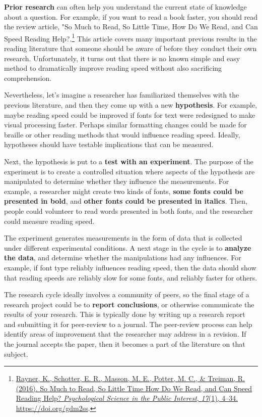 \documentclass[
  oneside,
  12pt]{crumpbook}
\begin{document}
\textbf{Prior research} can often help you understand the current state of knowledge about a question. For example, if you want to read a book faster, you should read the review article, "So Much to Read, So Little Time, How Do We Read, and Can Speed Reading Help?.\footnote{\protect\hyperlink{ref-raynerMuchReadLittle2016}{Rayner, K., Schotter, E. R., Masson, M. E., Potter, M. C., \& Treiman, R. (2016). So {Much} to {Read}, {So Little Time How Do We Read}, and {Can Speed Reading Help}? \emph{Psychological Science in the Public Interest}, \emph{17}(1), 4--34. \url{https://doi.org/gdm2ss}}.} This article covers many important previous results in the reading literature that someone should be aware of before they conduct their own research. Unfortunately, it turns out that there is no known simple and easy method to dramatically improve reading speed without also sacrificing comprehension.

Nevertheless, let's imagine a researcher has familiarized themselves with the previous literature, and then they come up with a new \textbf{hypothesis}. For example, maybe reading speed could be improved if fonts for text were redesigned to make visual processing faster. Perhaps similar formatting changes could be made for braille or other reading methods that would influence reading speed. Ideally, hypotheses should have testable implications that can be measured.

Next, the hypothesis is put to a \textbf{test with an experiment}. The purpose of the experiment is to create a controlled situation where aspects of the hypothesis are manipulated to determine whether they influence the measurements. For example, a researcher might create two kinds of fonts, \textbf{some fonts could be presented in bold}, and \textbf{other fonts could be presented in italics}. Then, people could volunteer to read words presented in both fonts, and the researcher could measure reading speed.

The experiment generates measurements in the form of data that is collected under different experimental conditions. A next stage in the cycle is to \textbf{analyze the data}, and determine whether the manipulations had any influences. For example, if font type reliably influences reading speed, then the data should show that reading speeds are reliably slow for some fonts, and reliably faster for others.

The research cycle ideally involves a community of peers, so the final stage of a research project could be to \textbf{report conclusions}, or otherwise communicate the results of your research. This is typically done by writing up a research report and submitting it for peer-review to a journal. The peer-review process can help identify areas of improvement that the researcher may address in a revision. If the journal accepts the paper, then it becomes a part of the literature on that subject.
\end{document}
